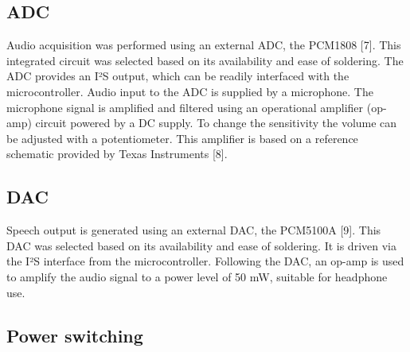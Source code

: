 \subsection{ADC}


Audio acquisition was performed using an external ADC, the PCM1808 [7].
This integrated circuit was selected based on its availability and ease of soldering.
 The ADC provides an I²S output, which can be readily interfaced with the microcontroller.
Audio input to the ADC is supplied by a microphone. 
The microphone signal is amplified and filtered using an operational amplifier (op-amp) circuit powered by a DC supply.
To change the sensitivity the volume can be adjusted with a potentiometer.
This amplifier is based on a reference schematic provided by Texas Instruments [8]. 


\subsection{DAC}


Speech output is generated using an external DAC, the PCM5100A [9].
This DAC was selected based on its availability and ease of soldering. 
It is driven via the I²S interface from the microcontroller.
Following the DAC, an op-amp is used to amplify the audio signal to a power level of  50 mW, suitable for headphone use.

\subsection{Power switching}


